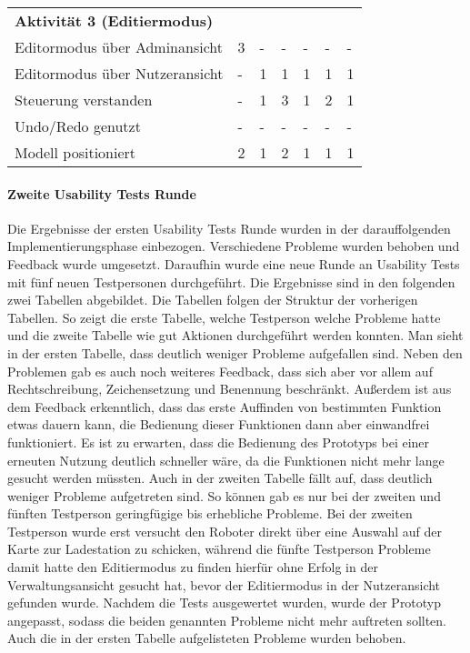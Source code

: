 \begin{table}[H]
\begin{tabular}{l||llllll}
        \textbf{Aktivität 3 (Editiermodus)} &           &           &           &           &           &           \\
        Editormodus über Adminansicht       &         3 &         - &         - &         - &         - &         - \\
        Editormodus über Nutzeransicht      &         - &         1 &         1 &         1 &         1 &         1 \\
        Steuerung verstanden                &         - &         1 &         3 &         1 &         2 &         1 \\
        Undo/Redo genutzt                   &         - &         - &         - &         - &         - &         - \\
        Modell positioniert                 &         2 &         1 &         2 &         1 &         1 &         1 \\
    \end{tabular}
\end{table}


\paragraph{Zweite Usability Tests Runde}

Die Ergebnisse der ersten Usability Tests Runde wurden in der darauffolgenden Implementierungsphase einbezogen. Verschiedene Probleme wurden behoben und Feedback wurde umgesetzt. Daraufhin wurde eine neue Runde an Usability Tests mit fünf neuen Testpersonen durchgeführt. Die Ergebnisse sind in den folgenden zwei Tabellen abgebildet. Die Tabellen folgen der Struktur der vorherigen Tabellen. So zeigt die erste Tabelle, welche Testperson welche Probleme hatte und die zweite Tabelle wie gut Aktionen durchgeführt werden konnten. Man sieht in der ersten Tabelle, dass deutlich weniger Probleme aufgefallen sind. Neben den Problemen gab es auch noch weiteres Feedback, dass sich aber vor allem auf Rechtschreibung, Zeichensetzung und Benennung beschränkt. Außerdem ist aus dem Feedback erkenntlich, dass das erste Auffinden von bestimmten Funktion etwas dauern kann, die Bedienung dieser Funktionen dann aber einwandfrei funktioniert. Es ist zu erwarten, dass die Bedienung des Prototyps bei einer erneuten Nutzung deutlich schneller wäre, da die Funktionen nicht mehr lange gesucht werden müssten. Auch in der zweiten Tabelle fällt auf, dass deutlich weniger Probleme aufgetreten sind. So können gab es nur bei der zweiten und fünften Testperson geringfügige bis erhebliche Probleme. Bei der zweiten Testperson wurde erst versucht den Roboter direkt über eine Auswahl auf der Karte zur Ladestation zu schicken, während die fünfte Testperson Probleme damit hatte den Editiermodus zu finden hierfür ohne Erfolg in der Verwaltungsansicht gesucht hat, bevor der Editiermodus in der Nutzeransicht gefunden wurde. Nachdem die Tests ausgewertet wurden, wurde der Prototyp angepasst, sodass die beiden genannten Probleme nicht mehr auftreten sollten. Auch die in der ersten Tabelle aufgelisteten Probleme wurden behoben.

